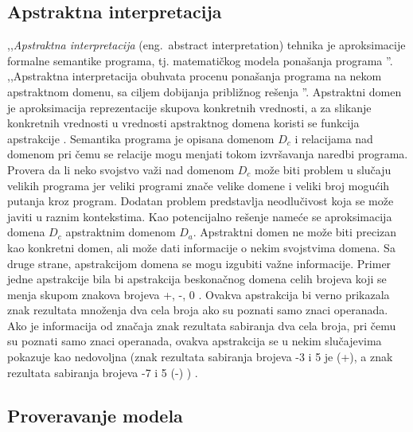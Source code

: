 \documentclass[12pt,oneside]{memoir}
\begin{document}
\subsection{Apstraktna interpretacija}
,,\textit{Apstraktna interpretacija} (eng.~abstract interpretation) tehnika je aproksimacije formalne semantike programa, tj. matematičkog modela ponašanja programa \cite{mvj}''. ,,Apstraktna interpretacija obuhvata procenu ponašanja programa na nekom apstraktnom domenu, sa ciljem dobijanja približnog rešenja \cite{AutoTechnFormSofVer}''. Apstraktni domen je aproksimacija reprezentacije skupova konkretnih vrednosti, a za slikanje konkretnih vrednosti u vrednosti apstraktnog domena koristi se funkcija apstrakcije \cite{AutoTechnFormSofVer}. Semantika programa je opisana domenom $D_c$ i relacijama nad domenom pri čemu se relacije mogu menjati tokom izvršavanja naredbi programa. Provera da li neko svojstvo važi nad domenom $D_c$ može biti problem u slučaju velikih programa jer veliki programi znače velike domene i veliki broj mogućih putanja kroz program. Dodatan problem predstavlja neodlučivost koja se može javiti u raznim kontekstima. Kao potencijalno rešenje nameće se aproksimacija domena $D_c$ apstraktnim domenom $D_a$. Apstraktni domen ne može biti precizan kao konkretni domen, ali može dati informacije o nekim svojstvima domena. Sa druge strane, apstrakcijom domena se mogu izgubiti važne informacije. Primer jedne apstrakcije bila bi apstrakcija beskonačnog domena celih brojeva koji se menja skupom znakova brojeva {+, -, 0 }. Ovakva apstrakcija bi verno prikazala znak rezultata množenja dva cela broja ako su poznati samo znaci operanada. Ako je informacija od značaja znak rezultata sabiranja dva cela broja, pri čemu su poznati samo znaci operanada, ovakva apstrakcija se u nekim slučajevima pokazuje kao nedovoljna (znak rezultata sabiranja brojeva -3 i 5 je (+), a znak rezultata sabiranja brojeva -7 i 5 (-) ) \cite{mvj}. 


\subsection{Proveravanje modela}
\end{document}
